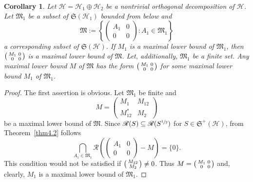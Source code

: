 \documentclass[12pt, a4paper, reqno, twoside]{amsart}
\numberwithin{equation}{section}
\newcommand{\frakS}{\mathfrak S}
\newcommand{\frakM}{\mathfrak M}
\newtheorem{corollary}[theorem]{Corollary}
\theoremstyle{definition}
\theoremstyle{remark}
\theoremstyle{mystyle}
\begin{document}
\begin{corollary}  
\label{cor4.3a}
Let $\mathscr H=\mathscr H_{1}\oplus\mathscr H_{2}$ be a nontrivial
orthogonal decomposition of $\mathscr H$. Let $\frakM_{1}$ be a subset
of $\frakS(\mathscr H_{1})$ bounded from below and
\[
  \frakM:= \left\{
    \begin{pmatrix}
      A_{1} & 0 \\ 0 & 0
    \end{pmatrix} : A_{1} \in\frakM_{1}\right\}
\]  
a corresponding subset of $\frakS(\mathscr H)$. If $M_{1}$ is a
maximal lower bound of $\frakM_{1}$, then
$\begin{psmallmatrix} M_{1} & 0 \\ 0 & 0 \end{psmallmatrix}$
is a maximal lower bound of $\frakM$. Let, additionally,
$\frakM_{1}$ be a finite set. Any maximal lower bound $M$ of $\frakM$
has the form
$\begin{psmallmatrix} M_{1} & 0 \\ 0 & 0 \end{psmallmatrix}$
for some maximal lower bound $M_{1}$ of $\frakM_{1}$.
\end{corollary}

\begin{proof}
The first assertion is obvious. Let $\frakM_{1}$ be finite and
\[
M = \begin{pmatrix} M_{1} & M_{12} \\ M_{12}^{\ast} & M_{2} \end{pmatrix}
\]  
be a maximal lower bound of $\frakM$. Since
$\mathscr R(S)\subseteq\mathscr R(S^{\sfrac{1}{2}})$ for
$S\in\frakS^{+}(\mathscr H)$, from Theorem~\ref{thm4.2} follows
\[
  \bigcap_{A_{1}\in\frakM_{1}}
  \mathscr R\left(\begin{pmatrix} A_{1} & 0 \\ 0 & 0 \end{pmatrix}- M \right)
    = \{0\}.
\]  
This condition would not be satisfied if
$\begin{psmallmatrix} M_{12} \\ M_{2}\end{psmallmatrix}\neq 0$. Thus
$M=\begin{psmallmatrix} M_{1} & 0 \\ 0 & 0 \end{psmallmatrix}$
and, clearly, $M_{1}$ is a maximal lower bound of $\frakM_{1}$.
\end{proof}
\end{document}
